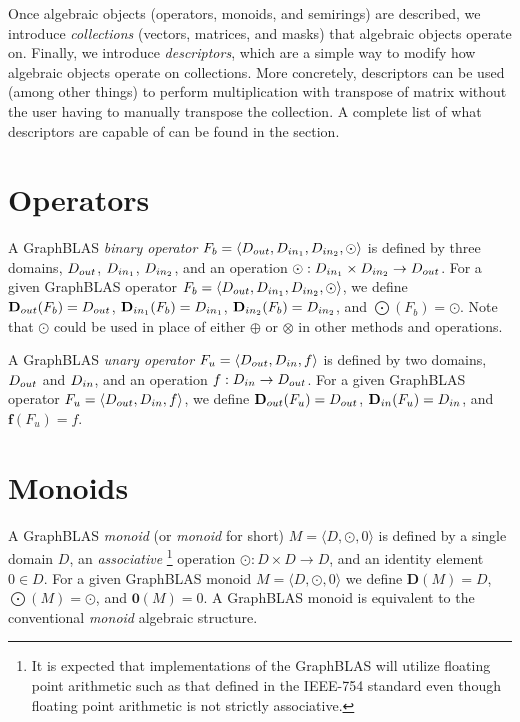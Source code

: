 Once algebraic objects (operators, monoids, and semirings) are described,
we introduce \emph{collections} (vectors, matrices, and masks) that
algebraic objects operate on. Finally, we introduce \emph{descriptors},
which are a simple way to modify how algebraic objects operate on
collections. More concretely, descriptors can be used (among other
things) to perform multiplication with transpose of matrix without the
user having to manually transpose the collection. A complete list of
what descriptors are capable of can be found in the section.

\section{Operators}

A GraphBLAS \emph{binary operator} $F_b = \langle \mbox{$D_{out}$}, \mbox{$D_{in_{1}}$}, \mbox{$D_{in_{2}}$}, 
\odot \rangle$
is defined by three domains, $\mbox{$D_{out}$}$, $\mbox{$D_{in_{1}}$}$, $\mbox{$D_{in_{2}}$}$, and an operation
$\odot: \mbox{$D_{in_{1}}$} \times \mbox{$D_{in_{2}}$} \rightarrow \mbox{$D_{out}$}$.  For a given GraphBLAS operator
$F_b=\langle \mbox{$D_{out}$}, \mbox{$D_{in_{1}}$}, \mbox{$D_{in_{2}}$}, \odot \rangle$, we define $\mbox{$\mathbf{D}_{out}$}(F_b) = \mbox{$D_{out}$}$,
$\mbox{$\mathbf{D}_{in_{1}}$}(F_b) = \mbox{$D_{in_{1}}$}$, $\mbox{$\mathbf{D}_{in_{2}}$}(F_b) = \mbox{$D_{in_{2}}$}$, and $\mathbf{\bigodot}(F_b)
= \odot$.  Note that $\odot$ could be used in place of either $\oplus$ or 
$\otimes$ in other methods and operations.

A GraphBLAS \emph{unary operator} $F_u = \langle \mbox{$D_{out}$}, \mbox{$D_{in}$}, f\rangle$
is defined by two domains, $\mbox{$D_{out}$}$ and $\mbox{$D_{in}$}$, and an operation
$f: \mbox{$D_{in}$} \rightarrow \mbox{$D_{out}$}$.  For a given GraphBLAS operator
$F_u=\langle \mbox{$D_{out}$}, \mbox{$D_{in}$}, f \rangle$, we define $\mbox{$\mathbf{D}_{out}$}(F_u) = \mbox{$D_{out}$}$, 
$\mbox{$\mathbf{D}_{in}$}(F_u) = \mbox{$D_{in}$}$, and $\mathbf{f}(F_u) = f$.

\section{Monoids}

A GraphBLAS \emph{monoid} (or \emph{monoid} for short) $M =
\langle D,\odot,0 \rangle$ is defined by a single domain $D$, an 
\emph{associative}
\footnote{\label{Foot:associative}It is expected 
that implementations of the GraphBLAS will utilize floating point arithmetic 
such as that defined in the IEEE-754 standard even though
floating point arithmetic is not strictly associative.} 
operation $\odot: D \times D \rightarrow D$,
and an identity element $0 \in D$.  For a given GraphBLAS monoid $M=\langle
D,\odot,0 \rangle$ we define $\mathbf{D}(M) = D$, $\mathbf{\bigodot}(M) =
\odot$, and $\mathbf{0}(M) = 0$.  A GraphBLAS monoid is equivalent to 
the conventional \emph{monoid} algebraic structure.

